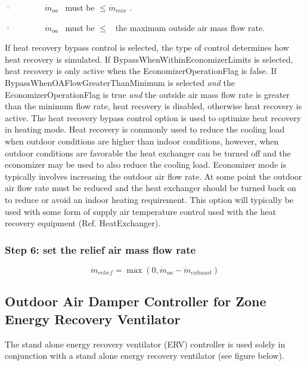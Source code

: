 ·~~~~~~~~\({\dot m_{oa}}\) ~must be \(\le {\dot m_{mix}}\) .

·~~~~~~~~\({\dot m_{oa}}\) ~must be \(\le\) ~the maximum outside air mass flow rate.

If heat recovery bypass control is selected, the type of control determines how heat recovery is simulated. If BypassWhenWithinEconomizerLimits is selected, heat recovery is only active when the EconomizerOperationFlag is false. If BypassWhenOAFlowGreaterThanMinimum is selected \emph{and} the EconomizerOperationFlag is true \emph{and} the outside air mass flow rate is greater than the minimum flow rate, heat recovery is disabled, otherwise heat recovery is active. The heat recovery bypass control option is used to optimize heat recovery in heating mode. Heat recovery is commonly used to reduce the cooling load when outdoor conditions are higher than indoor conditions, however, when outdoor conditions are favorable the heat exchanger can be turned off and the economizer may be used to also reduce the cooling load. Economizer mode is typically involves increasing the outdoor air flow rate. At some point the outdoor air flow rate must be reduced and the heat exchanger should be turned back on to reduce or avoid an indoor heating requirement. This option will typically be used with some form of supply air temperature control used with the heat recovery equipment (Ref. HeatExchanger).

\subsubsection{Step 6: set the relief air mass flow rate}\label{step-6-set-the-relief-air-mass-flow-rate}

\begin{equation}
{\dot m_{relief}} = \max (0,{\dot m_{oa}} - {\dot m_{exhaust}})
\end{equation}

\subsection{Outdoor Air Damper Controller for Zone Energy Recovery Ventilator}\label{outdoor-air-damper-controller-for-zone-energy-recovery-ventilator}

The stand alone energy recovery ventilator (ERV) controller is used solely in conjunction with a stand alone energy recovery ventilator (see figure below).

